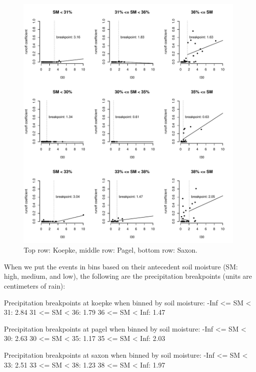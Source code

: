 \documentclass[12pt]{article}
\begin{document}
\begin{figure}
    \begin{center}
\includegraphics{runoff-I30_binned}
    \end{center}
    \caption{Top row: Koepke, middle row: Pagel, bottom row: Saxon.\label{I30_binned}}
\end{figure}


When we put the events in bins based on their antecedent soil moisture (SM: high, medium, and low), the following are the precipitation breakpoints (units are centimeters of rain):\\

\begin{Schunk}
\begin{Soutput}
Precipitation breakpoints at koepke when binned by soil moisture:
-Inf <= SM < 31: 2.84
31 <= SM < 36: 1.79
36 <= SM < Inf: 1.47

Precipitation breakpoints at pagel when binned by soil moisture:
-Inf <= SM < 30: 2.63
30 <= SM < 35: 1.17
35 <= SM < Inf: 2.03

Precipitation breakpoints at saxon when binned by soil moisture:
-Inf <= SM < 33: 2.51
33 <= SM < 38: 1.23
38 <= SM < Inf: 1.97
\end{Soutput}
\end{Schunk}
\end{document}
